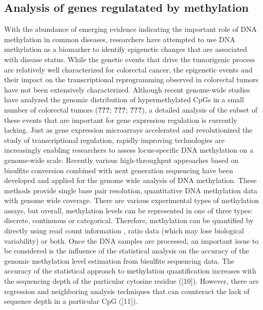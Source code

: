 \documentclass[10pt,letterpaper]{article}
\begin{document}
\hypertarget{analysis-of-genes-regulatated-by-methylation}{%
\subsection{Analysis of genes regulatated by
methylation}\label{analysis-of-genes-regulatated-by-methylation}}

With the abundance of emerging evidence indicating the important role of
DNA methylation in common diseases, researchers have attempted to use
DNA methylation as a biomarker to identify epigenetic changes that are
associated with disease status. While the genetic events that drive the
tumorigenic process are relatively well characterized for colorectal
cancer, the epigenetic events and their impact on the transcriptional
reprogramming observed in colorectal tumors have not been extensively
characterized. Although recent genome-wide studies have analyzed the
genomic distribution of hypermethylated CpGs in a small number of
colorectal tumors (\textbf{???}; \textbf{???}; \textbf{???}), a detailed
analysis of the subset of these events that are important for gene
expression regulation is currently lacking. Just as gene expression
microarrays accelerated and revolutionized the study of transcriptional
regulation, rapidly improving technologies are increasingly enabling
researchers to assess locus-specific DNA methylation on a genome-wide
scale. Recently various high-throughput approaches based on bisulfite
conversion combined with next generation sequencing have been developed
and applied for the genome wide analysis of DNA methylation. These
methods provide single base pair resolution, quantitative DNA
methylation data with genome wide coverage. There are various
experimental types of methylation assays, but overall, methylation
levels can be represented in one of three types: discrete, continuous or
categorical. Therefore, methylation can be quantified by directly using
read count information , ratio data (which may lose biological
variability) or both. Once the DNA samples are processed, an important
issue to be considered is the influence of the statistical analysis on
the accuracy of the genomic methylation level estimation from bisulfite
sequencing data. The accuracy of the statistical approach to methylation
quantification increases with the sequencing depth of the particular
cytosine residue ({[}10{]}). However, there are regression and
neighboring analysis techniques that can counteract the lack of sequence
depth in a particular CpG ({[}11{]}).
\end{document}
